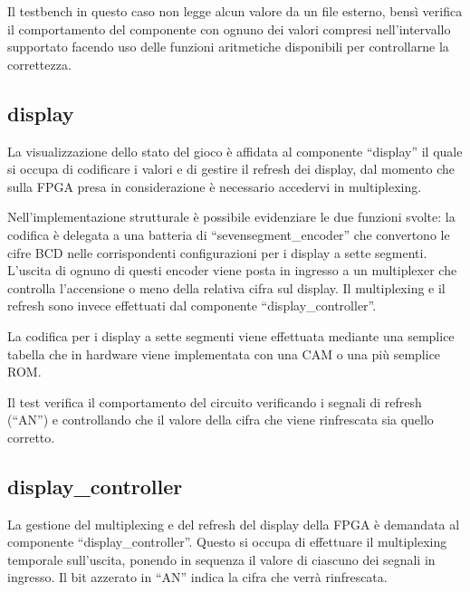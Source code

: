 \documentclass [11pt,a4paper,oneside,draft]{article}
\begin{document}


Il testbench in questo caso non legge alcun valore da un file esterno,
bensì verifica il comportamento del componente con ognuno dei valori
compresi nell'intervallo supportato facendo uso delle funzioni
aritmetiche disponibili per controllarne la correttezza.

\subsection{display}

La visualizzazione dello stato del gioco è affidata al componente
``display'' il quale si occupa di codificare i valori e di gestire
il refresh dei display, dal momento che sulla FPGA presa in 
considerazione è necessario accedervi in multiplexing.



Nell'implementazione strutturale è possibile evidenziare le due
funzioni svolte: la codifica è delegata a una batteria di
``sevensegment\_encoder'' che convertono le cifre BCD nelle
corrispondenti configurazioni per i display a sette segmenti.
L'uscita di ognuno di questi encoder viene posta in ingresso a
un multiplexer che controlla l'accensione o meno della relativa
cifra sul display. Il multiplexing e il refresh sono invece
effettuati dal componente ``display\_controller''.



La codifica per i display a sette segmenti viene effettuata
mediante una semplice tabella che in hardware viene
implementata con una CAM o una più semplice ROM.



Il test verifica il comportamento del circuito verificando
i segnali di refresh (``AN'') e controllando che il valore
della cifra che viene rinfrescata sia quello corretto.

\subsection{display\_controller}

La gestione del multiplexing e del refresh del display della FPGA
è demandata al componente ``display\_controller''. Questo si occupa
di effettuare il multiplexing temporale sull'uscita, ponendo in
sequenza il valore di ciascuno dei segnali in ingresso. Il bit 
azzerato in ``AN'' indica la cifra che verrà rinfrescata.
\end{document}
